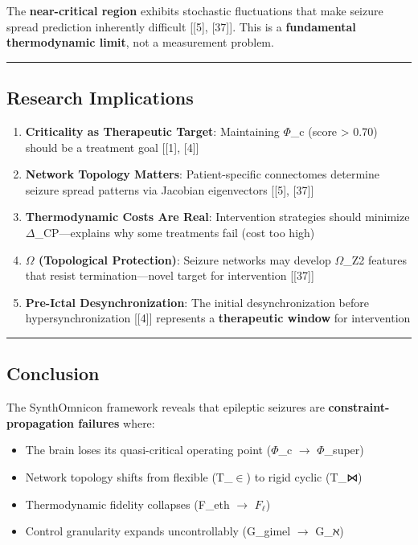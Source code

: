 \documentclass[12pt,a4paper]{article}
\begin{document}
The \textbf{near-critical region} exhibits stochastic fluctuations that make seizure spread prediction inherently difficult {[}{[}5{]}, {[}37{]}{]}. This is a \textbf{fundamental thermodynamic limit}, not a measurement problem.

\begin{center}
\rule{0.5\textwidth}{0.4pt}
\end{center}

\subsection{Research Implications}

\begin{enumerate}
    \item \textbf{Criticality as Therapeutic Target}: Maintaining $\Phi$\_c (score \textgreater{} 0.70) should be a treatment goal {[}{[}1{]}, {[}4{]}{]}
    \item \textbf{Network Topology Matters}: Patient-specific connectomes determine seizure spread patterns via Jacobian eigenvectors {[}{[}5{]}, {[}37{]}{]}
    \item \textbf{Thermodynamic Costs Are Real}: Intervention strategies should minimize $\Delta$\xi\_CP---explains why some treatments fail (cost too high)
    \item \textbf{$\Omega$ (Topological Protection)}: Seizure networks may develop $\Omega$\_Z2 features that resist termination---novel target for intervention {[}{[}37{]}{]}
    \item \textbf{Pre-Ictal Desynchronization}: The initial desynchronization before hypersynchronization {[}{[}4{]}{]} represents a \textbf{therapeutic window} for intervention
\end{enumerate}

\begin{center}
\rule{0.5\textwidth}{0.4pt}
\end{center}

\subsection{Conclusion}

The SynthOmnicon framework reveals that epileptic seizures are \textbf{constraint-propagation failures} where:

\begin{itemize}
    \item The brain loses its quasi-critical operating point ($\Phi$\_c $\rightarrow$ $\Phi$\_super)
    \item Network topology shifts from flexible (T\_$\in$) to rigid cyclic (T\_⋈)
    \item Thermodynamic fidelity collapses (F\_eth $\rightarrow$ $F_{\ell}$)
    \item Control granularity expands uncontrollably (G\_gimel $\rightarrow$ G\_ℵ)
\end{itemize}
\end{document}
